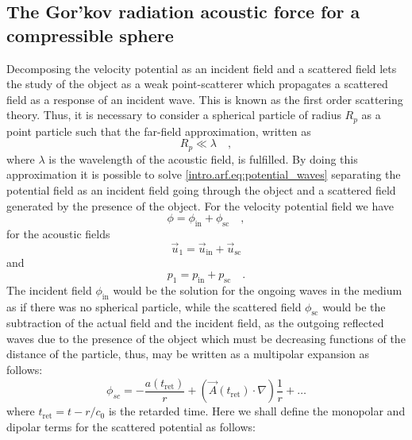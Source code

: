 \subsection{The Gor'kov radiation acoustic force for a compressible sphere}
Decomposing the velocity potential as an incident field and a scattered field lets the study of the object as a weak point-scatterer which propagates a scattered field as a response of an incident wave. This is known as the first order scattering theory. Thus, it is necessary to consider a spherical particle of radius $R_p$ as a point particle such that the far-field approximation, written as
\begin{equation}\label{intro.arf.eq:R_ll_lambda}
    R_p\ll\lambda\quad,
\end{equation}
where $\lambda$ is the wavelength of the acoustic field, is fulfilled. By doing this approximation it is possible to solve \eqref{intro.arf.eq:potential_waves} separating the potential field as an incident field going through the object and a scattered field generated by the presence of the object. For the velocity potential field we have
\begin{equation}\label{intro.arf.eq:in_sc_potential}
    \phi = \phi_{\text{in}} + \phi_{\text{sc}}\quad,    
\end{equation}
for the acoustic fields
\begin{equation}\label{intro.arf.eq:in_sc_velocity}
    \vec u_1 = \vec u_{\text{in}} + \vec u_{\text{sc}}
\end{equation}
and
\begin{equation}\label{intro.arf.eq:in_sc_pressure}
    p_1 = p_{\text{in}} + p_{\text{sc}}\quad.
\end{equation}
The incident field $\phi_{\text{in}}$ would be the solution for the ongoing waves in the medium as if there was no spherical particle, while the scattered field $\phi_{\text{sc}}$ would be the subtraction of the actual field and the incident field, as the outgoing reflected waves due to the presence of the object which must be decreasing functions of the distance of the particle, thus, may be written as a multipolar expansion as follows:
\begin{equation}\label{intro.arf.eq:sc_multipoles}
    \phi_{sc} = -\frac{a(t_{\text{ret}})}{r} + (\vec A(t_{\text{ret}}) \cdot \nabla)\frac{1}{r} + \dots
\end{equation}
where $t_{\text{ret}} = t - r/c_0$ is the retarded time. Here we shall define the monopolar and dipolar terms for the scattered potential as follows:
